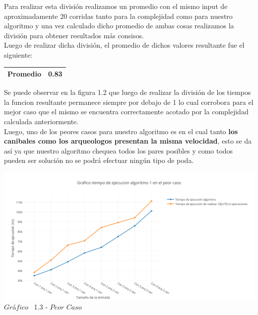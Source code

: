  Para realizar esta divisi\'on realizamos un promedio con el mismo input de aproximadamente 20 corridas tanto para la complejidad como para nuestro algoritmo y una vez calculado dicho promedio de ambas cosas realizamos la divisi\'on para
obtener resultados m\'as consisos.\\ 

Luego de realizar dicha divisi\'on, el promedio de dichos valores resultante fue el siguiente:

\begin{center}
\begin{table}[H]

    \begin{tabular}{ | l |l |}
    \hline

\textbf{Promedio} & 0.83 \\ \hline

    \end{tabular}
\end{table}
\end{center}


Se puede observar en la figura 1.2 que luego de realizar la divisi\'on de los tiempos la funcion resultante permanece siempre por debajo de 1 lo cual corrobora para el mejor caso que el mismo se encuentra correctamente acotado por la complejidad calculada anteriormente.\\

Luego, uno de los peores casos para nuestro algoritmo es en el cual tanto \textbf{los canibales como los arqueologos presentan la misma velocidad}, esto se da as\'i ya que nuestro algoritmo chequea todos los pares posibles y como todos pueden ser soluci\'on no se podr\'a efectuar ning\'un tipo de poda.\\


\vspace*{0.3cm} \vspace*{0.3cm}
  \begin{center}
\includegraphics[scale=0.65]{./EJ1/peorcasoej1.png}
{$Gr$\'a$fico$ \ 1.3 - $Peor$ $Caso$}
  \end{center}
  \vspace*{0.3cm}

